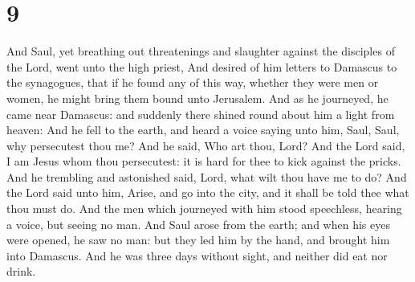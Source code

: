 \hypertarget{section-8}{%
\section{9}\label{section-8}}

 And Saul, yet breathing out threatenings and slaughter
against the disciples of the Lord, went unto the high priest,
 And desired of him letters to Damascus to the synagogues,
that if he found any of this way, whether they were men or women, he
might bring them bound unto Jerusalem.  And as he
journeyed, he came near Damascus: and suddenly there shined round about
him a light from heaven:  And he fell to the earth, and
heard a voice saying unto him, Saul, Saul, why persecutest thou me?
 And he said, Who art thou, Lord? And the Lord said, I am
Jesus whom thou persecutest: it is hard for thee to kick against the
pricks.  And he trembling and astonished said, Lord, what
wilt thou have me to do? And the Lord said unto him, Arise, and go into
the city, and it shall be told thee what thou must do. 
And the men which journeyed with him stood speechless, hearing a voice,
but seeing no man.  And Saul arose from the earth; and
when his eyes were opened, he saw no man: but they led him by the hand,
and brought him into Damascus.  And he was three days
without sight, and neither did eat nor drink.

